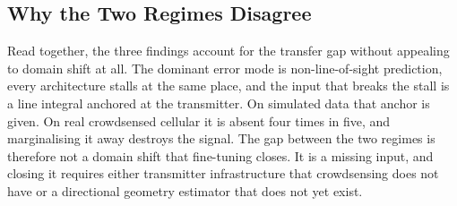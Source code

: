 \subsection{Why the Two Regimes Disagree}

Read together, the three findings account for the transfer gap without appealing to
domain shift at all. The dominant error
mode is non-line-of-sight prediction, every architecture stalls at the same place,
and the input that breaks the stall is a line integral anchored at the transmitter.
On simulated data that anchor is given. On real crowdsensed cellular it is absent
four times in five, and marginalising it away destroys the signal. The gap between
the two regimes is therefore not a domain shift that fine-tuning closes. It is a
missing input, and closing it requires either transmitter infrastructure that
crowdsensing does not have or a directional geometry estimator that does not yet
exist.

